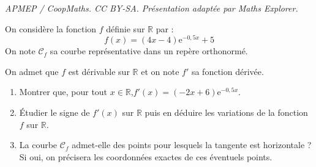 \documentclass[10pt]{article}
\providecommand{\R}{\mathbb{R}}
\providecommand{\e}{{\mathrm{e}}}
\begin{document}
\noindent\textit{APMEP / CoopMaths. CC BY-SA. Présentation adaptée par Maths Explorer.}\par\medskip
On considère la fonction $f$ définie sur $\R$ par :
\[f(x)=(4 x-4) \e^{-0,5 x}+5\]
On note $\mathcal{C}_{f}$ sa courbe représentative dans un repère orthonormé.

On admet que $f$ est dérivable sur $\R$ et on note $f'$ sa fonction dérivée.

\begin{enumerate}
	\item Montrer que, pour tout $x \in \R$,\quad $f'(x)=(-2 x+6) \e^{-0,5 x}$.

	\item Étudier le signe de $f'(x)$ sur $\R$ puis en déduire les variations de la fonction $f$ sur $\R$.

	\item La courbe $\mathcal{C}_{f}$ admet-elle des points pour lesquels la tangente est horizontale ? Si oui, on précisera les coordonnées exactes de ces éventuels points.
\end{enumerate}
\end{document}
